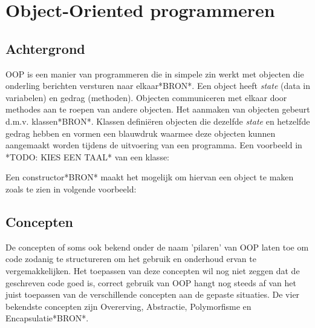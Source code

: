 \section{Object-Oriented programmeren}
\subsection{Achtergrond}
OOP is een manier van programmeren die in simpele zin werkt met objecten die onderling berichten versturen naar elkaar*BRON*. Een object heeft \textit{state} (data in variabelen) en gedrag (methoden). Objecten communiceren met elkaar door methodes aan te roepen van andere objecten. Het aanmaken van objecten gebeurt d.m.v. klassen*BRON*. Klassen definiëren objecten die dezelfde \textit{state} en hetzelfde gedrag hebben en vormen een blauwdruk waarmee deze objecten kunnen aangemaakt worden tijdens de uitvoering van een programma. Een voorbeeld in *TODO: KIES EEN TAAL* van een klasse: 


Een constructor*BRON* maakt het mogelijk om hiervan een object te maken zoals te zien in volgende voorbeeld:


\subsection{Concepten}
De concepten of soms ook bekend onder de naam 'pilaren' van OOP laten toe om code zodanig te structureren om het gebruik en onderhoud ervan te vergemakkelijken. Het toepassen van deze concepten wil nog niet zeggen dat de geschreven code goed is, correct gebruik van OOP hangt nog steeds af van het juist toepassen van de verschillende concepten aan de gepaste situaties. De vier bekendste concepten zijn Overerving, Abstractie, Polymorfisme en Encapsulatie*BRON*.

